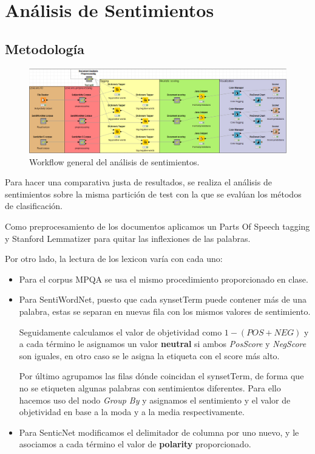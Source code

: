 \section{Análisis de Sentimientos}

\subsection{Metodología}

\begin{figure}[H]
    \center\includegraphics[width=.95\linewidth]{img/analysis/workflow.png}
    \caption{Workflow general del análisis de sentimientos.}
\end{figure}

Para hacer una comparativa justa de resultados, se realiza el análisis de sentimientos sobre la misma partición de test con la que se evalúan los métodos de clasificación.

Como preprocesamiento de los documentos aplicamos un Parts Of Speech tagging y Stanford Lemmatizer para quitar las inflexiones de las palabras.

\vspace{\baselineskip}

Por otro lado, la lectura de los lexicon varía con cada uno:
\begin{itemize}
    \item Para el corpus MPQA se usa el mismo procedimiento proporcionado en clase.
    \item Para SentiWordNet, puesto que cada synsetTerm puede contener más de una palabra, estas se separan en nuevas fila con los mismos valores de sentimiento.

    Seguidamente calculamos el valor de objetividad como $1 - (POS + NEG)$ y a cada término le asignamos un valor \textbf{neutral} si ambos \textit{PosScore} y \textit{NegScore} son iguales, en otro caso se le asigna la etiqueta con el score más alto.

    Por último agrupamos las filas dónde coincidan el synsetTerm, de forma que no se etiqueten algunas palabras con sentimientos diferentes. Para ello hacemos uso del nodo \textit{Group By} y asignamos el sentimiento y el valor de objetividad en base a la moda y a la media respectivamente.
    \item Para SenticNet modificamos el delimitador de columna por uno nuevo, y le asociamos a cada término el valor de \textbf{polarity} proporcionado.
\end{itemize}

